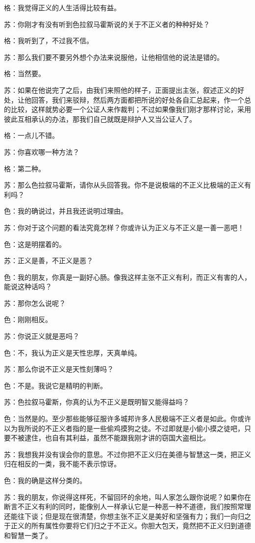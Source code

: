 \documentclass[12pt,oneside]{book}
\begin{document}
格：我觉得正义的人生活得比较有益。

苏：你刚才有没有听到色拉叙马霍斯说的关于不正义者的种种好处？

格：我听到了，不过我不信。

苏：那么我们要不要另外想个办法来说服他，让他相信他的说法是错的。

格：当然要。

苏：如果在他说完了之后，由我们来照他的样子，正面提出主张，叙述正义的好处，让他回答，我们来驳辩，然后两方面都把所说的好处各自汇总起来，作一个总的比较，这样就势必要一个公证人来作裁判；不过如果像我们刚才那样讨论，采用彼此互相承认的办法，那我们自己就既是辩护人又当公证人了。

格：一点儿不错。

苏：你喜欢哪一种方法？

格：第二种。

苏：那么色拉叙马霍斯，请你从头回答我。你不是说极端的不正义比极端的正义有利吗？

色：我的确说过，并且我还说明过理由。

苏：你对于这个问题的看法究竟怎样？你或许认为正义与不正义是一善一恶吧！

色：这是明摆着的。

苏：正义是善，不正义是恶？

色：我的朋友，你真是一副好心肠。像我这样主张不正义有利，而正义有害的人，能说这种话吗？

苏：那你怎么说呢？

色：刚刚相反。

苏：你说正义就是恶吗？

色：不，我认为正义是天性忠厚，天真单纯。

苏：那么你说不正义是天性刻薄吗？

色：不是。我说它是精明的判断。

苏：色拉叙马霍斯，你真的认为不正义是既明智又能得益吗？

色：当然是的。至少那些能够征服许多城邦许多人民极端不正义者是如此。你或许以为我所说的不正义者指的是一些偷鸡摸狗之徒。不过即就是小偷小摸之徒吧，只要不被逮住，也自有其利益，虽然不能跟我刚才讲的窃国大盗相比。

苏：我想我并没有误会你的意思。不过你把不正义归在美德与智慧这一类，把正义归在相反的一类，我不能不表示惊讶。

色：我的确是这样分类的。

苏：我的朋友，你说得这样死，不留回环的余地，叫人家怎么跟你说呢？如果你在断言不正义有利的同时，能像别人一样承认它是一种恶一种不道德，我们按照常理还能往下谈；但是现在很清楚，你想主张不正义是美好和坚强有力；我们一向归之于正义的所有属性你要将它们归之于不正义。你胆大包天，竟然把不正义归到道德和智慧一类了。
\end{document}
